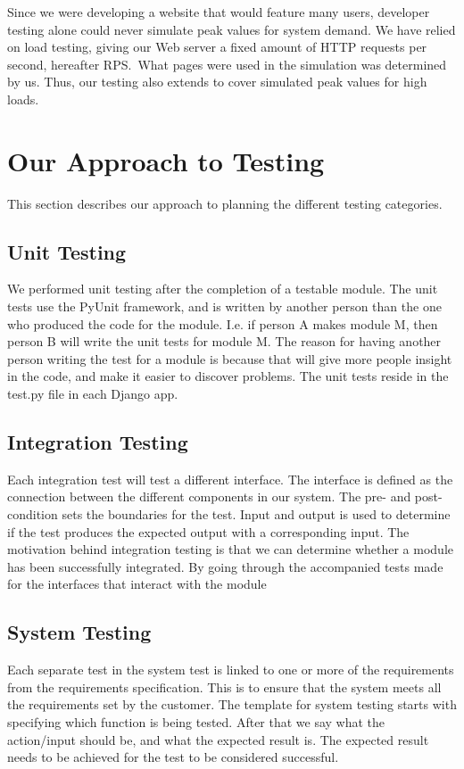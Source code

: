 Since we were developing a website that would feature many users,
developer testing alone could never simulate peak values for system
demand. We have relied on load testing, giving our Web
server a fixed amount of HTTP requests per second, hereafter RPS.\ What
pages were used in the simulation was determined by us. Thus, our
testing also extends to cover simulated peak values for high loads.

\section{Our Approach to Testing}
This section describes our approach to planning the different testing categories.
\subsection{Unit Testing}

We performed unit testing after the completion of a testable module. The
unit tests use the PyUnit framework, and is written by another person
than the one who produced the code for the module. I.e. if
person A makes module M, then person B will write the unit tests for
module M. The reason for having another person writing the test for a
module is because that will give more people insight in the code, and
make it easier to discover problems. The unit tests reside in the test.py 
file in each Django app.

\subsection{Integration Testing}
Each integration test will test a different interface. The interface is
defined as the connection between the different components in our
system. The pre- and post-condition sets the boundaries for the test.
Input and output is used to determine if the test produces the expected
output with a corresponding input. The motivation behind integration testing is that we
can determine whether a module has been successfully integrated. By
going through the accompanied tests made for the interfaces that
interact with the module


\subsection{System Testing}
Each separate test in the system test is linked to one or more of the
requirements from the requirements specification. This is to ensure 
that the system meets all the requirements set by the customer. The template for
system testing starts with specifying which function is being tested.
After that we say what the action/input should be, and what the
expected result is. The expected result needs to be achieved for the
test to be considered successful.


